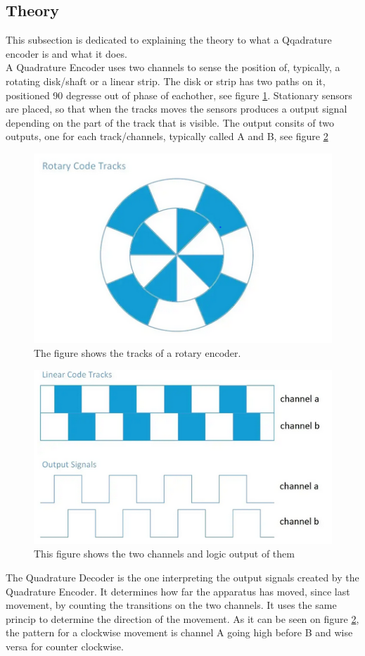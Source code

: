 \documentclass[../../../main]{subfiles}
\begin{document}
\subsection{Theory}
\label{sub:Theory}

This subsection is dedicated to explaining the theory to what a Qqadrature encoder is and what it does. \\
A Quadrature Encoder uses two channels to sense the position of, typically, a rotating disk/shaft or a linear strip. The disk or strip has two paths on it, positioned 90 degresse out of phase of eachother, see figure \ref{rotary_encoder}. Stationary sensors are placed, so that when the tracks moves the sensors produces a output signal depending on the part of the track that is visible. The output consits of two outputs, one for each track/channels, typically called A and B, see figure \ref{channels_1}

\begin{figure}[H]
  \includegraphics{pictures/encoder.png}
  \caption{The figure shows the tracks of a rotary encoder.}
  \label{rotary_encoder}
\end{figure}

\begin{figure}[H]
  \includegraphics{pictures/channels.png}
  \caption{This figure shows the two channels and logic output of them}
  \label{channels_1}
\end{figure}

The Quadrature Decoder is the one interpreting the output signals created by the Quadrature Encoder. It determines how far the apparatus has moved, since last movement, by counting the transitions on the two channels. It uses the same princip to determine the direction of the movement. As it can be seen on figure \ref{channels_1}, the pattern for a clockwise movement is channel A going high before B and wise versa for counter clockwise.
\end{document}
